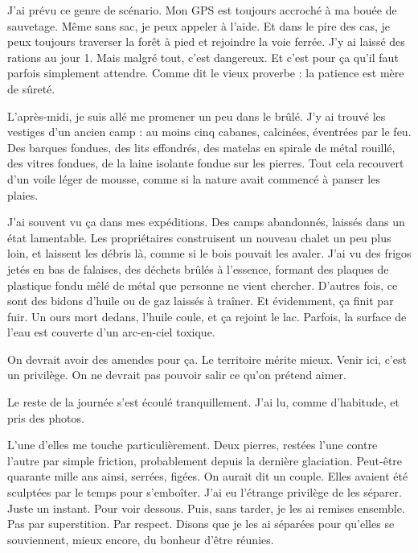 J’ai prévu ce genre de scénario. Mon GPS est toujours accroché à ma bouée de sauvetage. Même sans sac, je peux appeler à l’aide. Et dans le pire des cas, je peux toujours traverser la forêt à pied et rejoindre la voie ferrée. J’y ai laissé des rations au jour 1. Mais malgré tout, c’est dangereux. Et c’est pour ça qu’il faut parfois simplement attendre. Comme dit le vieux proverbe : la patience est mère de sûreté.

L’après-midi, je suis allé me promener un peu dans le brûlé. J’y ai trouvé les vestiges d’un ancien camp : au moins cinq cabanes, calcinées, éventrées par le feu. Des barques fondues, des lits effondrés, des matelas en spirale de métal rouillé, des vitres fondues, de la laine isolante fondue sur les pierres. Tout cela recouvert d’un voile léger de mousse, comme si la nature avait commencé à panser les plaies.

J’ai souvent vu ça dans mes expéditions. Des camps abandonnés, laissés dans un état lamentable. Les propriétaires construisent un nouveau chalet un peu plus loin, et laissent les débris là, comme si le bois pouvait les avaler. J’ai vu des frigos jetés en bas de falaises, des déchets brûlés à l’essence, formant des plaques de plastique fondu mêlé de métal que personne ne vient chercher. D’autres fois, ce sont des bidons d’huile ou de gaz laissés à traîner. Et évidemment, ça finit par fuir. Un ours mort dedans, l’huile coule, et ça rejoint le lac. Parfois, la surface de l’eau est couverte d’un arc-en-ciel toxique.

On devrait avoir des amendes pour ça. Le territoire mérite mieux. Venir ici, c’est un privilège. On ne devrait pas pouvoir salir ce qu’on prétend aimer.

Le reste de la journée s’est écoulé tranquillement. J’ai lu, comme d’habitude, et pris des photos.

L’une d’elles me touche particulièrement. Deux pierres, restées l’une contre l’autre par simple friction, probablement depuis la dernière glaciation. Peut-être quarante mille ans ainsi, serrées, figées. On aurait dit un couple. Elles avaient été sculptées par le temps pour s’emboîter. J’ai eu l’étrange privilège de les séparer. Juste un instant. Pour voir dessous. Puis, sans tarder, je les ai remises ensemble. Pas par superstition. Par respect. Disons que je les ai séparées pour qu’elles se souviennent, mieux encore, du bonheur d’être réunies.










